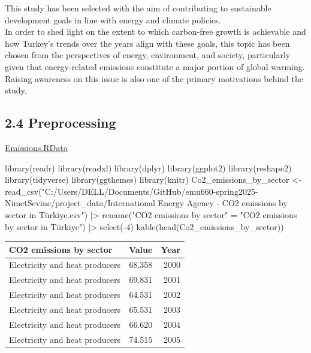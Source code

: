 \documentclass[
  letterpaper,
  DIV=11,
  numbers=noendperiod]{scrartcl}
\newenvironment{Shaded}{\begin{snugshade}}{\end{snugshade}}
\newcommand{\DecValTok}[1]{\textcolor[rgb]{0.68,0.00,0.00}{#1}}
\newcommand{\FunctionTok}[1]{\textcolor[rgb]{0.28,0.35,0.67}{#1}}
\newcommand{\NormalTok}[1]{\textcolor[rgb]{0.00,0.23,0.31}{#1}}
\newcommand{\OtherTok}[1]{\textcolor[rgb]{0.00,0.23,0.31}{#1}}
\newcommand{\SpecialCharTok}[1]{\textcolor[rgb]{0.37,0.37,0.37}{#1}}
\newcommand{\StringTok}[1]{\textcolor[rgb]{0.13,0.47,0.30}{#1}}
\begin{document}
This study has been selected with the aim of contributing to sustainable
development goals in line with energy and climate policies.\\
In order to shed light on the extent to which carbon-free growth is
achievable and how Turkey's trends over the years align with these
goals, this topic has been chosen from the perspectives of energy,
environment, and society, particularly given that energy-related
emissions constitute a major portion of global warming.\\
Raising awareness on this issue is also one of the primary motivations
behind the study.

\subsection{2.4 Preprocessing}\label{preprocessing}

\href{https://github.com/emu-hacettepe-analytics/emu660-spring2025-NimetSevinc/blob/main/emissions.RData}{Emissions.RData}

\begin{Shaded}
\begin{Highlighting}[]
\FunctionTok{library}\NormalTok{(readr)}
\FunctionTok{library}\NormalTok{(readxl)}
\FunctionTok{library}\NormalTok{(dplyr)}
\FunctionTok{library}\NormalTok{(ggplot2)}
\FunctionTok{library}\NormalTok{(reshape2)}
\FunctionTok{library}\NormalTok{(tidyverse)}
\FunctionTok{library}\NormalTok{(ggthemes)}
\FunctionTok{library}\NormalTok{(knitr)}
\NormalTok{Co2\_emissions\_by\_sector }\OtherTok{\textless{}{-}} \FunctionTok{read\_csv}\NormalTok{(}\StringTok{"C:/Users/DELL/Documents/GitHub/emu660{-}spring2025{-}NimetSevinc/project\_data/International Energy Agency {-} CO2 emissions by sector in Türkiye.csv"}\NormalTok{) }\SpecialCharTok{|\textgreater{}} \FunctionTok{rename}\NormalTok{(}\StringTok{"CO2 emissions by sector"} \OtherTok{=} \StringTok{"CO2 emissions by sector in Türkiye"}\NormalTok{) }\SpecialCharTok{|\textgreater{}} \FunctionTok{select}\NormalTok{(}\SpecialCharTok{{-}}\DecValTok{4}\NormalTok{)}
\FunctionTok{kable}\NormalTok{(}\FunctionTok{head}\NormalTok{(Co2\_emissions\_by\_sector))}
\end{Highlighting}
\end{Shaded}

\begin{longtable}[]{@{}lrr@{}}
\toprule\noalign{}
CO2 emissions by sector & Value & Year \\
\midrule\noalign{}
\endhead
\bottomrule\noalign{}
\endlastfoot
Electricity and heat producers & 68.358 & 2000 \\
Electricity and heat producers & 69.831 & 2001 \\
Electricity and heat producers & 64.531 & 2002 \\
Electricity and heat producers & 65.531 & 2003 \\
Electricity and heat producers & 66.620 & 2004 \\
Electricity and heat producers & 74.515 & 2005 \\
\end{longtable}
\end{document}
